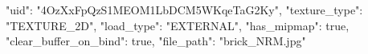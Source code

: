 {
    "uid": "4OzXxFpQzS1MEOM1LbDCM5WKqeTaG2Ky",
    "texture_type": "TEXTURE_2D",
    "load_type": "EXTERNAL",
    "has_mipmap": true,
    "clear_buffer_on_bind": true,
    "file_path": "brick_NRM.jpg"
}